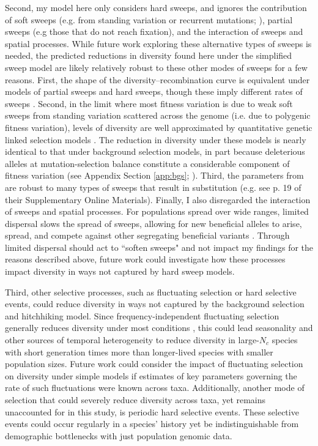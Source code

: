 \documentclass[9pt,lineno]{elife}
\begin{document}
Second, my model here only considers hard sweeps, and ignores the contribution
of soft sweeps (e.g. from standing variation or recurrent mutations;
\cite{Hermisson2005-hs,Pennings2006-lj}), partial sweeps (e.g those that do not
reach fixation), and the interaction of sweeps and spatial processes. While
future work exploring these alternative types of sweeps is needed, the
predicted reductions in diversity found here under the simplified sweep model
are likely relatively robust to these other modes of sweeps for a few reasons.
First, the shape of the diversity--recombination curve is equivalent under
models of partial sweeps and hard sweeps, though these imply different rates of
sweeps \citep{Coop2012-cd}. Second, in the limit where most fitness
variation is due to weak soft sweeps from standing variation scattered across
the genome (i.e. due to polygenic fitness variation), levels of diversity are
well approximated by quantitative genetic linked selection models
\citep{Robertson1961-ho,Santiago1995-hx,Santiago1998-bs}. The reduction in
diversity under these models is nearly identical to that under background
selection models, in part because deleterious alleles at mutation-selection
balance constitute a considerable component of fitness variation (see Appendix
Section \ref{app:bgs}; \cite{Charlesworth2000-km,Charlesworth2015-am}). Third,
the parameters from \cite{Elyashiv2016-vt} are robust to many types of
sweeps that result in substitution (e.g. see p. 19 of their Supplementary
Online Materials). Finally, I also disregarded the interaction of sweeps and
spatial processes.  For populations spread over wide ranges, limited dispersal
slows the spread of sweeps, allowing for new beneficial alleles to arise,
spread, and compete against other segregating beneficial variants
\citep{Ralph2015-kl,Ralph2010-ki}. Through limited dispersal should act to
``soften sweeps" and not impact my findings for the reasons described above,
future work could investigate how these processes impact diversity in ways not
captured by hard sweep models.

Third, other selective processes, such as fluctuating selection or hard
selective events, could reduce diversity in ways not captured by the background
selection and hitchhiking model. Since frequency-independent fluctuating
selection generally reduces diversity under most conditions
\citep{Novak2017-yp}, this could lead seasonality and other sources of
temporal heterogeneity to reduce diversity in large-$N_c$ species with short
generation times more than longer-lived species with smaller population sizes.
Future work could consider the impact of fluctuating selection on diversity
under simple models \citep{Barton2000-zg} if estimates of key parameters
governing the rate of such fluctuations were known across taxa. Additionally,
another mode of selection that could severely reduce diversity across taxa, yet
remains unaccounted for in this study, is periodic hard selective events. These
selective events could occur regularly in a species' history yet be
indistinguishable from demographic bottlenecks with just population genomic
data. 
\end{document}
